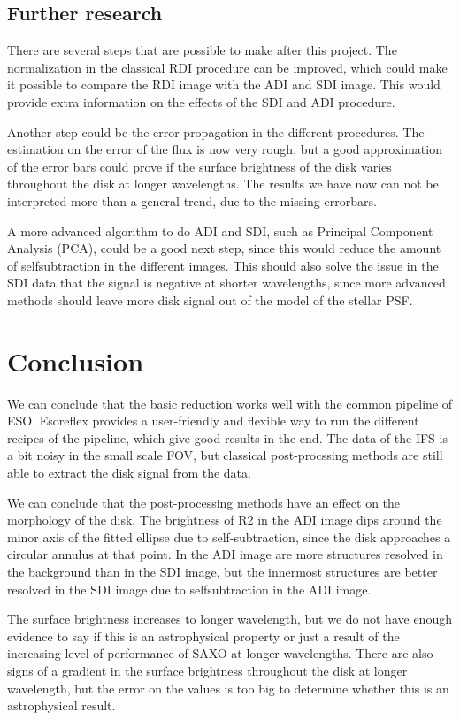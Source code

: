 \documentclass[twoside,single]{lion-msc}
\begin{document}
\section{Further research}
There are several steps that are possible to make after this project. The normalization in the classical RDI procedure can be improved, which could make it possible to compare the RDI image with the ADI and SDI image. This would provide extra information on the effects of the SDI and ADI procedure.
\bigskip

Another step could be the error propagation in the different procedures. The estimation on the error of the flux is now very rough, but a good approximation of the error bars could prove if the surface brightness of the disk varies throughout the disk at longer wavelengths. The results we have now can not be interpreted more than a general trend, due to the missing errorbars.
\bigskip

A more advanced algorithm to do ADI and SDI, such as Principal Component Analysis (PCA), could be a good next step, since this would reduce the amount of selfsubtraction in the different images. This should also solve the issue in the SDI data that the signal is negative at shorter wavelengths, since more advanced methods should leave more disk signal out of the model of the stellar PSF.

\chapter{Conclusion}
We can conclude that the basic reduction works well with the common pipeline of ESO. Esoreflex provides a user-friendly and flexible way to run the different recipes of the pipeline, which give good results in the end. The data of the IFS is a bit noisy in the small scale FOV, but classical post-procssing methods are still able to extract the disk signal from the data.
\bigskip

We can conclude that the post-processing methods have an effect on the morphology of the disk. The brightness of R2 in the ADI image dips around the minor axis of the fitted ellipse due to self-subtraction, since the disk approaches a circular annulus at that point. In the ADI image are more structures resolved in the background than in the SDI image, but the innermost structures are better resolved in the SDI image due to selfsubtraction in the ADI image.
\bigskip

The surface brightness increases to longer wavelength, but we do not have enough evidence to say if this is an astrophysical property or just a result of the increasing level of performance of SAXO at longer wavelengths. There are also signs of a gradient in the surface brightness throughout the disk at longer wavelength, but the error on the values is too big to determine whether this is an astrophysical result.
\end{document}
